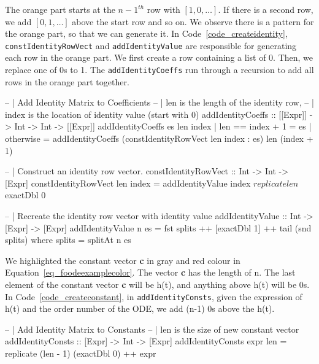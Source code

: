 The orange part starts at the ${n-1}^{th}$ row with $[1, 0, \dots]$. If there is a second row, we add $[0, 1, \dots]$ above the start row and so on. We observe there is a pattern for the orange part, so that we can generate it. In Code~\ref{code_createidentity}, \verb|constIdentityRowVect| and \verb|addIdentityValue| are responsible for generating each row in the orange part. We first create a row containing a list of 0. Then, we replace one of 0s to 1. The \verb|addIdentityCoeffs| run through a recursion to add all rows in the orange part together.

\begin{listing}[ht]
\begin{haskell1}
-- | Add Identity Matrix to Coefficients
-- | len is the length of the identity row,
-- | index is the location of identity value (start with 0)
addIdentityCoeffs :: [[Expr]] -> Int -> Int -> [[Expr]]
addIdentityCoeffs es len index
  | len == index + 1 = es
  | otherwise = addIdentityCoeffs (constIdentityRowVect len index : es) len (index + 1)

-- | Construct an identity row vector.
constIdentityRowVect :: Int -> Int -> [Expr]
constIdentityRowVect len index = addIdentityValue index $ replicate len $ exactDbl 0

-- | Recreate the identity row vector with identity value 
addIdentityValue :: Int -> [Expr] -> [Expr]
addIdentityValue n es = fst splits ++ [exactDbl 1] ++ tail (snd splits)
  where splits = splitAt n es
\end{haskell1}
\label{code_createidentity}
\end{listing}

We highlighted the constant vector \textbf{c} in gray and red colour in Equation~\ref{eq_foodeexamplecolor}. The vector \textbf{c} has the length of n. The last element of the constant vector \textbf{c} will be h(t), and anything above h(t) will be 0s. In Code~\ref{code_createconstant}, in \verb|addIdentityConsts|, given the expression of h(t) and the order number of the ODE, we add (n-1) 0s above the h(t). 

\begin{listing}[ht]
\begin{haskell1}
-- | Add Identity Matrix to Constants
-- | len is the size of new constant vector
addIdentityConsts :: [Expr] -> Int -> [Expr]
addIdentityConsts expr len = replicate (len - 1) (exactDbl 0) ++ expr
\end{haskell1}
\label{code_createconstant}
\end{listing}

